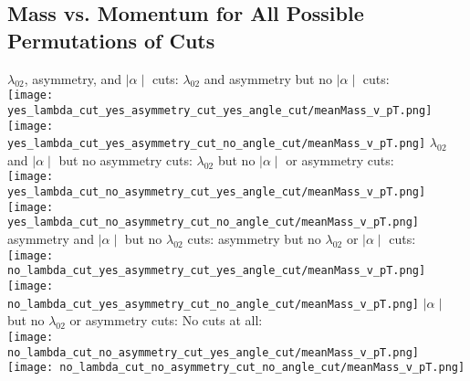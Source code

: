 \documentclass[11pt]{article}
\begin{document}
\subsection{Mass vs. Momentum for All Possible Permutations of Cuts}%
\begin{frame}{}
$\lambda_{02}$, asymmetry, and $\mid\alpha\mid$ cuts:
\noindent\hspace{1 cm}$\lambda_{02}$ and asymmetry but no $\mid\alpha\mid$ cuts:\\
\texttt{[image: yes\_lambda\_cut\_yes\_asymmetry\_cut\_yes\_angle\_cut/meanMass\_v\_pT.png]}
\texttt{[image: yes\_lambda\_cut\_yes\_asymmetry\_cut\_no\_angle\_cut/meanMass\_v\_pT.png]}
$\lambda_{02}$ and $\mid\alpha\mid$ but no asymmetry cuts:
\noindent\hspace{1 cm}$\lambda_{02}$ but no $\mid\alpha\mid$ or asymmetry cuts:\\
\texttt{[image: yes\_lambda\_cut\_no\_asymmetry\_cut\_yes\_angle\_cut/meanMass\_v\_pT.png]}
\texttt{[image: yes\_lambda\_cut\_no\_asymmetry\_cut\_no\_angle\_cut/meanMass\_v\_pT.png]}
asymmetry and $\mid\alpha\mid$ but no $\lambda_{02}$ cuts:
\noindent\hspace{1 cm}asymmetry but no $\lambda_{02}$ or $\mid\alpha\mid$ cuts:\\
\texttt{[image: no\_lambda\_cut\_yes\_asymmetry\_cut\_yes\_angle\_cut/meanMass\_v\_pT.png]}
\texttt{[image: no\_lambda\_cut\_yes\_asymmetry\_cut\_no\_angle\_cut/meanMass\_v\_pT.png]}
$\mid\alpha\mid$ but no $\lambda_{02}$ or asymmetry cuts:
\noindent\hspace{1 cm} No cuts at all:\\
\texttt{[image: no\_lambda\_cut\_no\_asymmetry\_cut\_yes\_angle\_cut/meanMass\_v\_pT.png]}
\texttt{[image: no\_lambda\_cut\_no\_asymmetry\_cut\_no\_angle\_cut/meanMass\_v\_pT.png]}
\end{frame}
\end{document}
